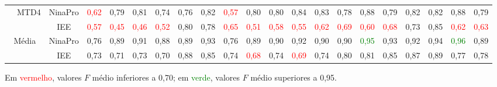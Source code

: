 \begin{sidewaystable}[htb]
{\begin{tabular}{cc|c|ccccccccccccccccc|c}
			\cline{2-21}                                                                                                                                                             
			& \multirow{2}{*}{MTD4}	& NinaPro	&\textcolor{red}{0,62}	&0,79	&0,81	&0,74	&0,76	&0,82	&\textcolor{red}{0,57}	&0,80	&0,80	&0,84	&0,83	&0,78	&0,88	&0,79	&0,82	&0,82	&0,88	&0,79\\
			&						& IEE		&\textcolor{red}{0,57}	&\textcolor{red}{0,45}	&\textcolor{red}{0,46}	&\textcolor{red}{0,52}	&0,80	&0,78	&\textcolor{red}{0,65}	&\textcolor{red}{0,51}	&\textcolor{red}{0,58}	&\textcolor{red}{0,55}	&\textcolor{red}{0,62}			&\textcolor{red}{0,69}	&\textcolor{red}{0,60}	&\textcolor{red}{0,68}	&0,73	&0,85	&\textcolor{red}{0,62}	&\textcolor{red}{0,63}\\
			\midrule
			
			\multicolumn{2}{c}{Média} 				& NinaPro	&0,76	&0,89	&0,91	&0,88	&0,89	&0,93	&0,76	&0,89	&0,90	&0,92	&0,90	&0,90	&\textcolor{green}{0,95}	&0,93	&0,92	&0,94	&\textcolor{green}{0,96}	&0,89\\
			&						& IEE		&0,73	&0,71	&0,73	&0,70	&0,88	&0,85	&0,74	&\textcolor{red}{0,68}	&0,74	&\textcolor{red}{0,69}	&0,74	&0,80	&0,81	&0,85	&0,87	&0,89	&0,77	&0,78\\
			\bottomrule
		\end{tabular}
	}{
	Em \textcolor{red}{vermelho}, valores $F$ médio inferiores a 0,70;
	em \textcolor{green}{verde}, valores $F$ médio superiores a 0,95.
	}
\end{sidewaystable}











 
























